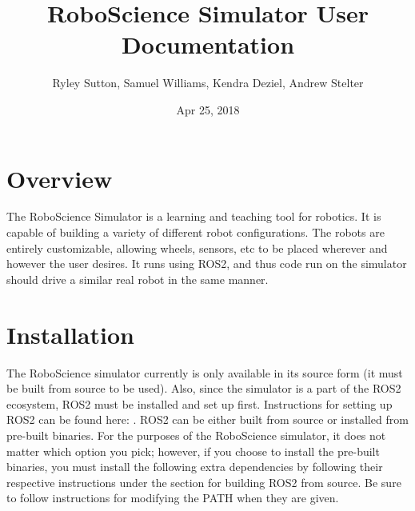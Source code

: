 \documentclass[letterpaper,10pt,english]{sphinxmanual}
\title{RoboScience Simulator User Documentation}
\date{Apr 25, 2018}
\author{Ryley Sutton, Samuel Williams, Kendra Deziel, Andrew Stelter}
\begin{document}
\maketitle
\sphinxtableofcontents
{}\label{\detokenize{index::doc}}



\chapter{Overview}
\label{\detokenize{index:roboscience-simulator}}\label{\detokenize{index:overview}}
The RoboScience Simulator is a learning and teaching tool for robotics. It is capable
of building a variety of different robot configurations. The robots are entirely customizable, allowing
wheels, sensors, etc to be placed wherever and however the user desires. It runs
using ROS2, and thus code run on the simulator should drive a similar real robot
in the same manner.


\chapter{Installation}
\label{\detokenize{index:installation}}
The RoboScience simulator currently is only available in its source form (it must be built
from source to be used). Also, since the simulator is a part of the ROS2 ecosystem, ROS2
must be installed and set up first. Instructions for setting up ROS2 can be found here:
. ROS2 can be either built from source or installed from pre-built binaries.
For the purposes of the RoboScience simulator, it does not matter which option you pick; however, if you choose
to install the pre-built binaries, you must install the following extra dependencies by
following their respective instructions under the section for building ROS2 from source.
Be sure to follow instructions for modifying the PATH when they are given.
\end{document}
